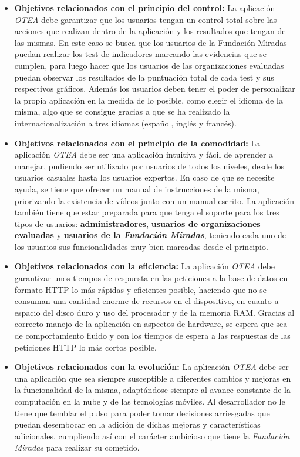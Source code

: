 \begin{itemize}
    \item \textbf{Objetivos relacionados con el principio del control: } La
    aplicación \textit{OTEA} debe garantizar que los usuarios tengan un control
    total sobre las acciones que realizan dentro de la aplicación y los
    resultados que tengan de las mismas. En este caso se busca que los usuarios
    de la Fundación Miradas puedan realizar los test de indicadores marcando las
    evidencias que se cumplen, para luego hacer que los usuarios de las
    organizaciones evaluadas puedan observar los resultados de la puntuación
    total de cada test y sus respectivos gráficos. Además los usuarios deben
    tener el poder de personalizar la propia aplicación en la medida de lo
    posible, como elegir el idioma de la misma, algo que se consigue gracias a
    que se ha realizado la internacionalización a tres idiomas (español, inglés
    y francés).
    \item \textbf{Objetivos relacionados con el principio de la comodidad: } La
    aplicación \textit{OTEA} debe ser una aplicación intuitiva y fácil de
    aprender a manejar, pudiendo ser utilizado por usuarios de todos los
    niveles, desde los usuarios casuales hasta los usuarios expertos. En caso de
    que se necesite ayuda, se tiene que ofrecer un manual de instrucciones de la
    misma, priorizando la existencia de vídeos junto con un manual escrito. La
    aplicación también tiene que estar preparada para que tenga el soporte para
    los tres tipos de usuarios: \textbf{administradores}, \textbf{usuarios de
    organizaciones evaluadas} y \textbf{usuarios de la \textit{Fundación
    Miradas}}, teniendo cada uno de los usuarios sus funcionalidades muy bien
    marcadas desde el principio.
    \item \textbf{Objetivos relacionados con la eficiencia: } La aplicación
    \textit{OTEA} debe garantizar unos tiempos de respuesta en las peticiones a
    la base de datos en formato HTTP lo más rápidas y eficientes posible,
    haciendo que no se consuman una cantidad enorme de recursos en el
    dispositivo, en cuanto a espacio del disco duro y uso del procesador y de la
    memoria RAM. Gracias al correcto manejo de la aplicación en aspectos de
    hardware, se espera que sea de comportamiento fluido y con los tiempos de
    espera a las respuestas de las peticiones HTTP lo más cortos posible.
    \item \textbf{Objetivos relacionados con la evolución: } La aplicación
    \textit{OTEA} debe ser una aplicación que sea siempre susceptible a
    diferentes cambios y mejoras en la funcionalidad de la misma, adaptándose
    siempre al avance constante de la computación en la nube y de las
    tecnologías móviles. Al desarrollador no le tiene que temblar el pulso para
    poder tomar decisiones arriesgadas que puedan desembocar en la adición de
    dichas mejoras y características adicionales, cumpliendo así con el carácter
    ambicioso que tiene la \textit{Fundación Miradas} para realizar su cometido. 
\end{itemize}

